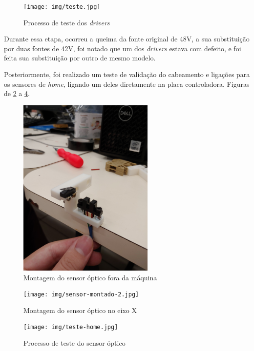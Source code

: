 \documentclass[
	article,			%
	11pt,				%
	oneside,			%
	a4paper,			%
	section=TITLE,		%
	english,			%
	brazil,				%
	sumario=tradicional
	]{abntex2}
\begin{document}
\begin{figure}[H]
    \centering
    \texttt{[image: img/teste.jpg]}
    \caption{Processo de teste dos \textit{drivers}}
    \label{fig:teste}
\end{figure}

Durante essa etapa, ocorreu a queima da fonte original de 48V, a sua substituição por duas fontes de 42V, foi notado que um dos \textit{drivers} estava com defeito, e foi feita sua substituição por outro de mesmo modelo.

Posteriormente, foi realizado um teste de validação do cabeamento e ligações para os sensores de \textit{home}, ligando um deles diretamente na placa controladora. Figuras de \ref{fig:sensor-montado} a \ref{fig:teste-home}.

\begin{figure}[H]
    \centering
    \includegraphics[width=0.6\textwidth]{img/sensor-montado.jpg}
    \caption{Montagem do sensor óptico fora da máquina}
    \label{fig:sensor-montado}
\end{figure}

\begin{figure}[H]
    \centering
    \texttt{[image: img/sensor-montado-2.jpg]}
    \caption{Montagem do sensor óptico no eixo X}
    \label{fig:sensor-montado-2}
\end{figure}

\begin{figure}[H]
    \centering
    \texttt{[image: img/teste-home.jpg]}
    \caption{Processo de teste do sensor óptico}
    \label{fig:teste-home}
\end{figure}
\end{document}
